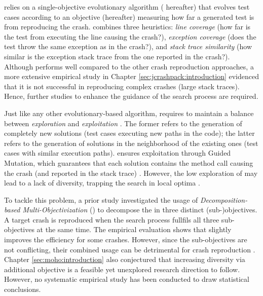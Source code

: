 \evocrash relies on a single-objective evolutionary algorithm (\textit{\SGGA} hereafter) that evolves test cases according to an objective (\CrashFunction hereafter) measuring how far a generated test is from reproducing the crash. \CrashFunction combines three heuristics: \textit{line coverage} (how far is the test from executing the line causing the crash?), \textit{exception coverage} (does the test throw the same exception as in the crash?), and \textit{stack trace similarity} (how similar is the exception stack trace from the one reported in the crash?). %
%
Although \SGGA performs well compared to the other crash reproduction approaches, a more extensive empirical study in Chapter \ref{sec:jcrashpack:introduction} evidenced that it is not successful in reproducing complex crashes (\ie large stack traces). Hence, further studies to enhance the guidance of the search process are required.

Just like any other evolutionary-based algorithm, \SGGA requires to maintain a balance between \textit{exploration} and \textit{exploitation} \cite{vcrepinvsek2013}. The former refers to the generation of completely new solutions (\ie test cases executing new paths in the code); the latter refers to the generation of solutions in the neighborhood of the existing ones (\ie test cases with similar execution paths). \SGGA ensures exploitation through Guided Mutation, which guarantees that each solution contains the method call causing the crash (and reported in the stack trace) \cite{Soltani2018a}. However, the low exploration of \SGGA may lead to a lack of diversity, trapping the search in local optima \cite{vcrepinvsek2013}.

To tackle this problem, a prior study \cite{Soltani2018b} investigated the usage of \textit{De\-com\-po\-si\-tion-based Multi-Objectivization} (\decomposition) to decompose the \CrashFunction in three distinct (sub-)objectives. A target crash is reproduced when the search process fullfils all three sub-objectives at the same time. The empirical evaluation shows that \decomposition slightly improves the efficiency for some crashes. However, since the sub-objectives are not conflicting, their combined usage can be detrimental for crash reproduction \cite{Soltani2018b}. Chapter \ref{sec:moho:introduction} also conjectured that increasing diversity via additional objective is a feasible yet unexplored  research direction to follow. However, no systematic empirical study has been conducted to draw statistical conclusions.

